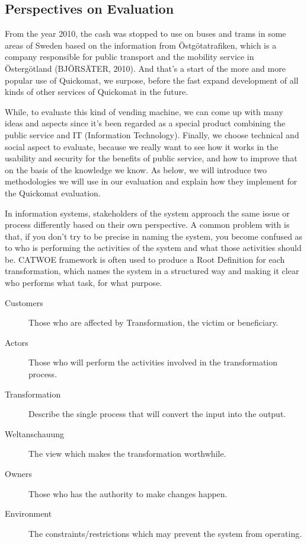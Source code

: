\documentclass[twocolumn]{article}
\begin{document}
\subsection{Perspectives on Evaluation}
From the year 2010, the cash was stopped to use on buses and trams in some areas of Sweden based on the information from Östgötatrafiken, which is a company responsible for public transport and the mobility service in Östergötland (BJÖRSÄTER, 2010). And that’s a start of the more and more popular use of Quickomat, we surpose, before the fast expand development of all kinds of other services of Quickomat in the future. 

While, to evaluate this kind of vending machine, we can come up with many ideas and aspects since it’s been regarded as a special product combining the public service and IT (Information Technology). Finally, we choose technical and social aspect to evaluate, because we really want to see how it works in the usability and security for the benefits of public service, and how to improve that on the basis of the knowledge we know.  As below, we will introduce two methodologies we will use in our evaluation and explain how they implement for the Quickomat evaluation. 

In information systems, stakeholders of the system approach the same issue or process differently based on their own perspective. A common problem with is that, if you don’t try to be precise in naming the system, you become confused as to who is performing the activities of the system and what those activities should be. CATWOE framework is often used to produce a Root Definition for each transformation, which names the system in a structured way and making it clear who performs what task, for what purpose.

\begin{description}
  \item[Customers]
    Those who are affected by Transformation, the victim or beneficiary.
  \item[Actors]
    Those who will perform the activities involved in the transformation process.
  \item[Transformation]
    Describe the single process that will convert the input into the output.
  \item[Weltanschauung]
    The view which makes the transformation worthwhile.
  \item[Owners]
    Those who has the authority to make changes happen.
  \item[Environment]
    The constraints/restrictions which may prevent the system from operating.
\end{description}
\end{document}
